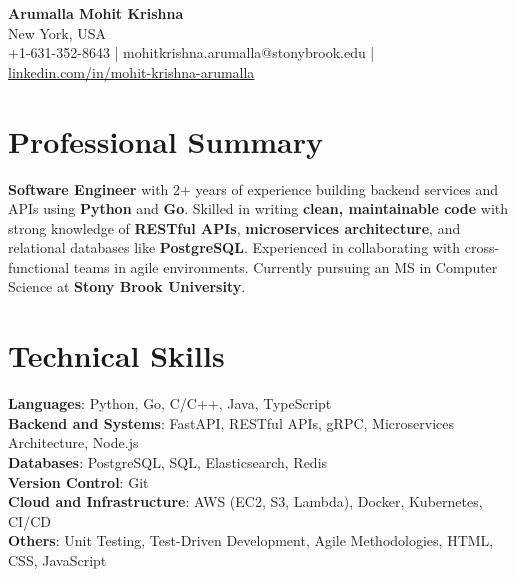 \documentclass[letterpaper,11pt]{article}
\begin{document}
\begin{center}
  {\Large \textbf{Arumalla Mohit Krishna}} \\
  New York, USA \\
  +1-631-352-8643 \enspace | \enspace mohitkrishna.arumalla@stonybrook.edu \enspace | \enspace \href{https://www.linkedin.com/in/mohit-krishna-arumalla}{linkedin.com/in/mohit-krishna-arumalla}
\end{center}

\section{Professional Summary}
  \begin{itemize}[leftmargin=0.15in, label={}]
    \small{\item{
     \textbf{Software Engineer} with 2+ years of experience building backend services and APIs using \textbf{Python} and \textbf{Go}. Skilled in writing \textbf{clean, maintainable code} with strong knowledge of \textbf{RESTful APIs}, \textbf{microservices architecture}, and relational databases like \textbf{PostgreSQL}. Experienced in collaborating with cross-functional teams in agile environments. Currently pursuing an MS in Computer Science at \textbf{Stony Brook University}.
    }}
  \end{itemize}
\vspace{-16pt}

\section{Technical Skills}
 \begin{itemize}[leftmargin=0.15in, label={}]
    \small{\item{
     \textbf{Languages}: Python, Go, C/C++, Java, TypeScript \\
     \textbf{Backend and Systems}: FastAPI, RESTful APIs, gRPC, Microservices Architecture, Node.js \\
     \textbf{Databases}: PostgreSQL, SQL, Elasticsearch, Redis \\
     \textbf{Version Control}: Git \\
     \textbf{Cloud and Infrastructure}: AWS (EC2, S3, Lambda), Docker, Kubernetes, CI/CD \\
     \textbf{Others}: Unit Testing, Test-Driven Development, Agile Methodologies, HTML, CSS, JavaScript
    }}
 \end{itemize}
\vspace{-16pt}
\end{document}
